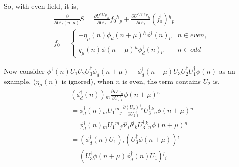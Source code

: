 So, with even field, it is,
\textcolor[rgb]{0,0,1}{
\begin{equation}
\begin{split}
&\frac{\partial}{\partial U{}^i{}_l(n,\mu)}S=\frac{\partial U^{eff}{}^p{}_h}{\partial U{}^i{}_l} f_0 {}^h{}_p+ \frac{\partial U^{eff,\dagger}{}^p{}_h}{\partial U{}^i{}_l} (f_0^{\dagger}) {}^h{}_p\\
&f_0=\left\{\begin{array}{cc} -\eta_{\mu}(n) \phi _d(n+\mu) {}^h \phi ^{\dagger}(n){}_p & n\in even, \\ \eta_{\mu}(n) \phi (n+\mu) {}^h \phi_d ^{\dagger}(n){}_p & n\in odd\end{array}\right.
\end{split}
\end{equation}
}


Now consider $\phi ^{\dagger}(n) U_1U_2U_3^{\dagger}\phi _{d}(n+\mu) - \phi _d^{\dagger}(n+\mu) U_3 U_2^{\dagger}U_1^{\dagger}\phi (n)$ as an example, ($\eta _{\mu}(n)$ is ignored), when $n$ is even, the term contains $U_2$ is,
\begin{equation}
\begin{split}
&(\phi _d^{\dagger}(n)){}_m \frac{\partial D{}^m{}_n}{\partial U_2{}^i{}_l}  \phi(n+\mu){}^n\\
&=\phi _d^{\dagger}(n){}_m U_1{}^m{}_j\frac{\partial (U_2){}^j{}_k}{\partial U_2{}^i{}_l} U_3^{\dagger}{}^k{}_n  \phi (n+\mu){}^n\\
&=\phi _d^{\dagger}(n){}_m U_1{}^m{}_j\delta {}^j{}_i \delta {}^l{}_k U_3^{\dagger}{}^k{}_n  \phi (n+\mu){}^n\\
&=(\phi _d^{\dagger}(n)U_1){}_i (U_3^{\dagger}\phi(n+\mu)){}^l\\
&=(U_3^{\dagger}\phi(n+\mu)\phi _d^{\dagger}(n)U_1){}^l{}_i\\
\end{split}
\end{equation}


